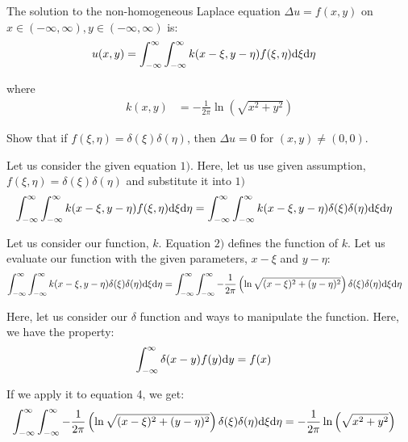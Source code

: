 \item The solution to the non-homogeneous Laplace equation $\Delta u = f(x, y)$ on $x \in (-\infty, \infty), y \in (-\infty, \infty)$ is:
%
\begin{align}
  u(x, y) & = \int^\infty_{-\infty} \int^\infty_{-\infty} k(x - \xi, y - \eta) f(\xi, \eta) \text d \xi \text d \eta
\end{align}

where
%
\begin{align}
  k(x, y) & = - \frac{1}{2 \pi} \ln\left( \sqrt{x^2 + y^2} \right)
\end{align}

Show that if $f(\xi, \eta) = \delta(\xi)\delta(\eta)$, then $\Delta u = 0$ for $(x, y) \neq (0, 0)$.

Let us consider the given equation $1)$. Here, let us use given assumption, $f(\xi, \eta) = \delta(\xi)\delta(\eta)$ and substitute it into $1)$
%
\begin{align}
  \int^\infty_{-\infty} \int^\infty_{-\infty}
  k(x - \xi, y - \eta) f(\xi, \eta) \text d \xi \text d \eta
  & =   \int^\infty_{-\infty} \int^\infty_{-\infty}
  k(x - \xi, y - \eta) \delta(\xi)\delta(\eta) \text d \xi \text d \eta
\end{align}

Let us consider our function, $k$. Equation $2)$ defines the function of $k$. Let us evaluate our function with the given parameters, $x - \xi$ and $y - \eta$:
%
\begin{align}
  \int^\infty_{-\infty} \int^\infty_{-\infty}
  k(x - \xi, y - \eta) \delta(\xi)\delta(\eta) \text d \xi \text d \eta
  & = \int^\infty_{-\infty} \int^\infty_{-\infty}
  - \frac{1}{2 \pi} \left(\ln \sqrt{(x - \xi)^2 + (y - \eta)^2} \right)
  \delta(\xi)\delta(\eta) \text d \xi \text d \eta
\end{align}

Here, let us consider our $\delta$ function and ways to manipulate the function. Here, we have the property:
%
\begin{align}
  \int^\infty_{-\infty} \delta(x - y)f(y) \text dy & = f(x)
\end{align}

If we apply it to equation 4, we get:
%
\begin{align}
  \int^\infty_{-\infty} \int^\infty_{-\infty}
  - \frac{1}{2 \pi} \left(\ln \sqrt{(x - \xi)^2 + (y - \eta)^2} \right)
  \delta(\xi)\delta(\eta) \text d \xi \text d \eta
  & = - \frac{1}{2 \pi} \ln\left( \sqrt{x^2 + y^2} \right)
\end{align}


